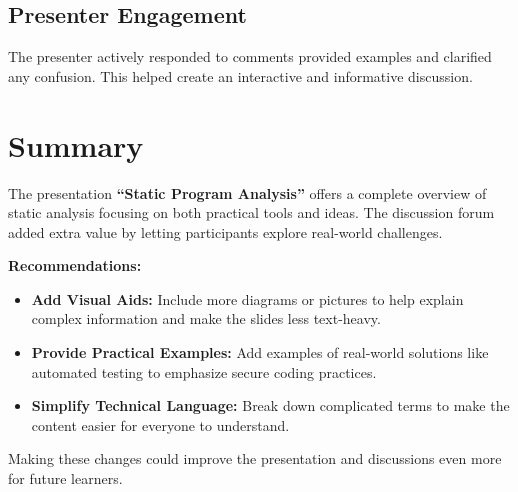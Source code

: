 \documentclass{article}
\begin{document}
\subsection*{Presenter Engagement}
The presenter actively responded to comments provided examples and clarified any confusion. This helped create an interactive and informative discussion.

\section*{Summary}

The presentation \textbf{“Static Program Analysis”} offers a complete overview of static analysis focusing on both practical tools and ideas. The discussion forum added extra value by letting participants explore real-world challenges.

\textbf{Recommendations:}

\begin{itemize}
\item \textbf{Add Visual Aids:} Include more diagrams or pictures to help explain complex information and make the slides less text-heavy.
\item \textbf{Provide Practical Examples:} Add examples of real-world solutions like automated testing to emphasize secure coding practices.
\item \textbf{Simplify Technical Language:} Break down complicated terms to make the content easier for everyone to understand.
\end{itemize}

Making these changes could improve the presentation and discussions even more for future learners.
\end{document}
